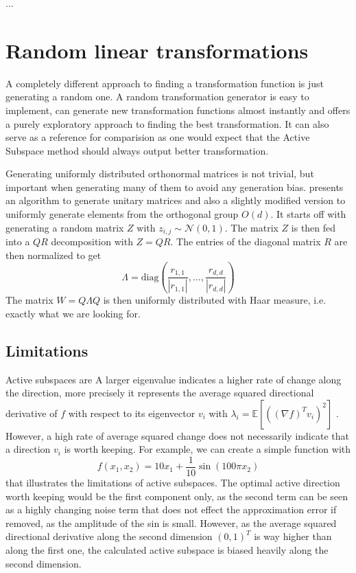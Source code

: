 \documentclass[
  a4paper,  %
  twoside,  %
  bibliography=totoc,
  headsepline,
  cleardoublepage=empty,
  parskip=half,
  draft=false
]{scrbook}
\begin{document}
...

\section{Random linear transformations}

A completely different approach to finding a transformation function is just generating a random one.
A random transformation generator is easy to implement, can generate new transformation functions almost instantly and offers a purely exploratory approach to finding the best transformation.
It can also serve as a reference for comparision as one would expect that the Active Subspace method should always output better transformation.

Generating uniformly distributed orthonormal matrices is not trivial, but important when generating many of them to avoid any generation bias.
\cite{ABC} presents an algorithm to generate unitary matrices and also a slightly modified version to uniformly generate elements from the orthogonal group $O(d)$.
It starts off with generating a random matrix $Z$ with $z_{i,j} \sim \mathcal{N}\left(0, 1\right)$.
The matrix $Z$ is then fed into a $QR$ decomposition with $Z=QR$.
The entries of the diagonal matrix $R$ are then normalized to get
\begin{equation}
\Lambda=\text{diag}\left(\frac{r_{1,1}}{|r_{1,1}|}, \dots, \frac{r_{d,d}}{|r_{d,d}|}\right)
\end{equation}
The matrix $W=Q \Lambda Q$ is then uniformly distributed with Haar measure, i.e. exactly what we are looking for.


\subsection{Limitations}

Active subspaces are
A larger eigenvalue indicates a higher rate of change along the direction, more precisely it represents the average squared directional derivative of $f$ with respect to its eigenvector $v_i$ with $\lambda_i=\mathds{E}[((\nabla f)^T v_i)^2]$ \cite{CG14}.
However, a high rate of average squared change does not necessarily indicate that a direction $v_i$ is worth keeping.
For example, we can create a simple function with
\begin{equation}
f(x_1, x_2)=10x_1 + \frac{1}{10} \sin(100 \pi x_2)
\end{equation}
that illustrates the limitations of active subspaces.
The optimal active direction worth keeping would be the first component only, as the second term can be seen as a highly changing noise term that does not effect the approximation error if removed, as the amplitude of the sin is small.
However, as the average squared directional derivative along the second dimension $(0,1)^T$ is way higher than along the first one, the calculated active subspace is biased heavily along the second dimension.
\end{document}
